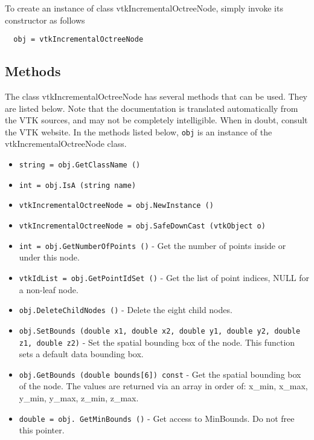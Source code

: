 To create an instance of class vtkIncrementalOctreeNode, simply
invoke its constructor as follows
\begin{verbatim}
  obj = vtkIncrementalOctreeNode
\end{verbatim}
\subsection{Methods}

The class vtkIncrementalOctreeNode has several methods that can be used.
  They are listed below.
Note that the documentation is translated automatically from the VTK sources,
and may not be completely intelligible.  When in doubt, consult the VTK website.
In the methods listed below, \verb|obj| is an instance of the vtkIncrementalOctreeNode class.
\begin{itemize}
\item  \verb|string = obj.GetClassName ()|

\item  \verb|int = obj.IsA (string name)|

\item  \verb|vtkIncrementalOctreeNode = obj.NewInstance ()|

\item  \verb|vtkIncrementalOctreeNode = obj.SafeDownCast (vtkObject o)|

\item  \verb|int = obj.GetNumberOfPoints ()| -  Get the number of points inside or under this node.

\item  \verb|vtkIdList = obj.GetPointIdSet ()| -  Get the list of point indices, NULL for a non-leaf node.

\item  \verb|obj.DeleteChildNodes ()| -  Delete the eight child nodes.

\item  \verb|obj.SetBounds (double x1, double x2, double y1, double y2, double z1, double z2)| -  Set the spatial bounding box of the node. This function sets a default
 data bounding box.

\item  \verb|obj.GetBounds (double bounds[6]) const| -  Get the spatial bounding box of the node. The values are returned via
 an array in order of: x\_min, x\_max, y\_min, y\_max, z\_min, z\_max.   

\item  \verb|double = obj. GetMinBounds ()| -  Get access to MinBounds. Do not free this pointer.


\end{itemize}
